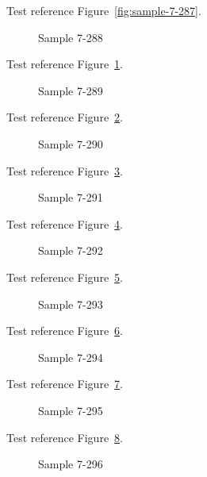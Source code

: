Test reference Figure~\ref{fig:sample-7-287}.

\begin{figure}[tbhp]
\caption{Sample 7-288}
\label{fig:sample-7-288}
\end{figure}

Test reference Figure~\ref{fig:sample-7-288}.

\begin{figure}[tbhp]
\caption{Sample 7-289}
\label{fig:sample-7-289}
\end{figure}

Test reference Figure~\ref{fig:sample-7-289}.

\begin{figure}[tbhp]
\caption{Sample 7-290}
\label{fig:sample-7-290}
\end{figure}

Test reference Figure~\ref{fig:sample-7-290}.

\begin{figure}[tbhp]
\caption{Sample 7-291}
\label{fig:sample-7-291}
\end{figure}

Test reference Figure~\ref{fig:sample-7-291}.

\begin{figure}[tbhp]
\caption{Sample 7-292}
\label{fig:sample-7-292}
\end{figure}

Test reference Figure~\ref{fig:sample-7-292}.

\begin{figure}[tbhp]
\caption{Sample 7-293}
\label{fig:sample-7-293}
\end{figure}

Test reference Figure~\ref{fig:sample-7-293}.

\begin{figure}[tbhp]
\caption{Sample 7-294}
\label{fig:sample-7-294}
\end{figure}

Test reference Figure~\ref{fig:sample-7-294}.

\begin{figure}[tbhp]
\caption{Sample 7-295}
\label{fig:sample-7-295}
\end{figure}

Test reference Figure~\ref{fig:sample-7-295}.

\begin{figure}[tbhp]
\caption{Sample 7-296}
\label{fig:sample-7-296}
\end{figure}

